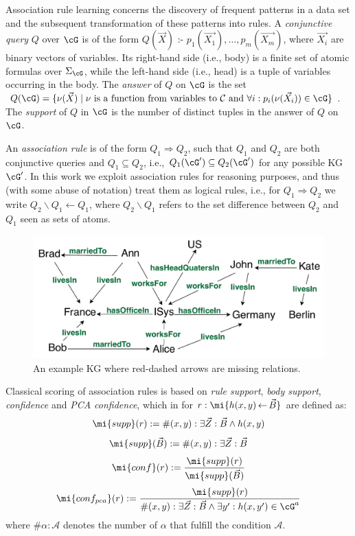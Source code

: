
Association rule learning concerns the discovery of frequent patterns in a data set and the subsequent transformation of these patterns into rules.
A \emph{conjunctive query} $Q$ over $\cG$ is of the form $Q(\vec{X}) \text{ :- } p_1(\vec{X_1}),\dotsc,p_m(\vec{X_m})$, where $\vec{X_i}$ are binary vectors of variables. Its  right-hand side (i.e., body) is a finite set of atomic formulas over $\Sigma_{\cG}$, while the left-hand side (i.e., head) is a tuple of variables occurring in the body. The \emph{answer} of $Q$ on $\cG$ is the set $Q(\cG) = \{ \nu(\vec{X}) \mid \nu \text{ is a function from variables to } \mathcal{C} \text{ and } \forall i: p_i(\nu(\vec{X_i})) \in \cG \}$.
The \emph{support} of
$Q$ in $\cG$ is the number of distinct tuples in the answer of $Q$ on $\cG$. 

An \emph{association rule} is of the form $Q_1 \Rightarrow  Q_2$, such that $Q_1$ and $Q_2$ are both conjunctive queries and $Q_1 \subseteq Q_2$, i.e., $Q_1(\cG')\subseteq Q_2(\cG')$ for any possible KG $\cG'$. In this work we exploit association rules for reasoning purposes, and thus (with some abuse of notation) treat them as logical rules, i.e., for $Q_1\Rightarrow Q_2$ we write $Q_2\backslash Q_1 \leftarrow Q_1$, where $Q_2 \backslash Q_1$ refers to the set difference between $Q_2$ and $Q_1$ seen as sets of atoms.
\begin{figure}[tb]
\centering
\includegraphics[width=.5\textwidth]{figures/kg3.pdf}
\caption{An example KG where red-dashed arrows are missing relations.}
\label{fig:kg}
\end{figure}
Classical scoring of association rules is based on \emph{rule support}, \emph{body support}, \emph{confidence} and \emph{PCA confidence}, which in \cite{amie} for
$r:\mi{h(x,y)\,{\leftarrow}\,\vec{B}}$
are defined as:
%
\begin{equation}\label{eq:supp}
\mi{supp}(r) := \#(x,y): \exists \vec{Z}: \vec{B} \wedge h(x,y)
\end{equation}
\begin{equation}\label{eq:body_supp}
\mi{supp}(\vec{B}) := \#(x,y): \exists \vec{Z}: \vec{B}
\end{equation}
\begin{equation}\label{eq:std_conf}
\mi{conf}(r) := \frac{\mi{supp}(r)}{\mi{supp}(\vec{B})}
\end{equation}
\begin{equation}\label{eq:pca_conf}
\mi{conf_{pca}}(r) := \frac{\mi{supp}(r)}{\#(x,y): \exists \vec{Z}: \vec{B} \wedge \exists y': h(x,y')\in \cG^a}
\end{equation}
where $\# \alpha : \mathcal{A}$ denotes the number of $\alpha$ that fulfill the condition $\mathcal{A}$.

